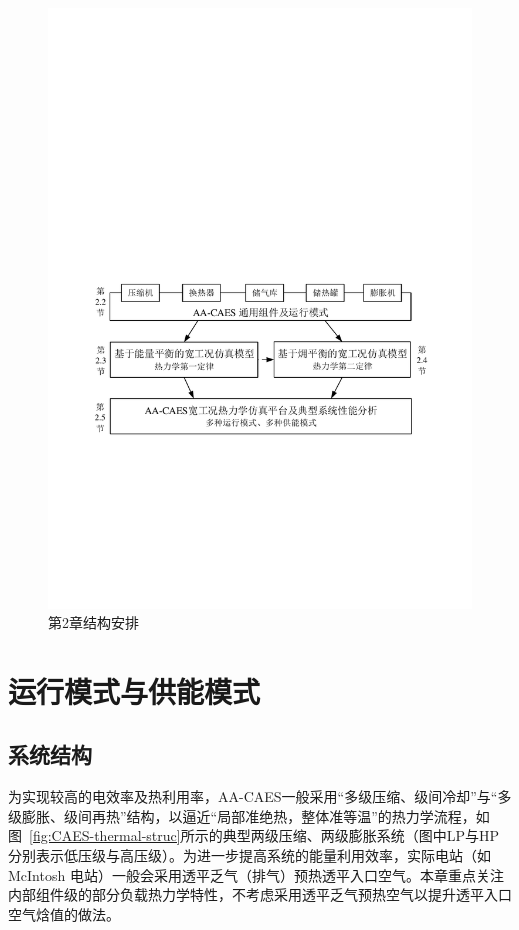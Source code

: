 \begin{figure}[H] %
  \centering
  \includegraphics[scale=0.80]{figures/Chap2-1-Model-Flow-Chart-V6.pdf}
  \caption{第2章结构安排}
  \label{fig:Model-Flow-Chart}
\end{figure}

\section{运行模式与供能模式}
\label{sec:chap2-struc-supply}
\subsection{系统结构}
为实现较高的电效率及热利用率，AA-CAES一般采用“多级压缩、级间冷却”与“多级膨胀、级间再热”结构，以逼近“局部准绝热，整体准等温”\cite{Thesis-Zhangxuelin}的热力学流程，如图~\ref{fig:CAES-thermal-struc}所示的典型两级压缩、两级膨胀系统（图中LP与HP分别表示低压级与高压级）。为进一步提高系统的能量利用效率，实际电站（如McIntosh 电站）一般会采用透平乏气（排气）预热透平入口空气。本章重点关注内部组件级的部分负载热力学特性，不考虑采用透平乏气预热空气以提升透平入口空气焓值的做法。

